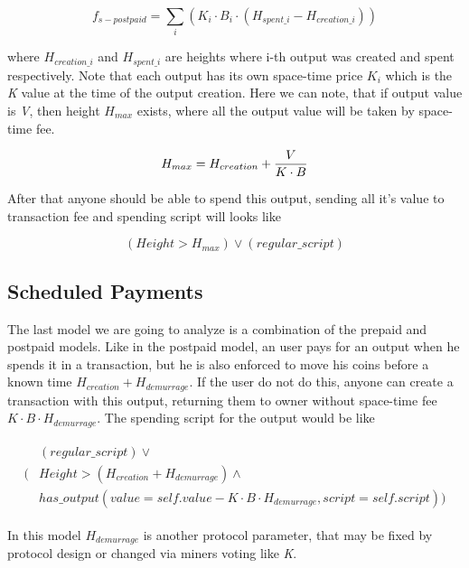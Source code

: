 \documentclass[]{article}   %
\begin{document}
\begin{equation}
f_{s-postpaid} = \sum_i{(K_i \cdot B_i \cdot (H_{spent\_i} - H_{creation\_i}))}
\end{equation}

where $H_{creation\_i}$ and $H_{spent\_i}$ are heights where i-th output was created and spent respectively. Note that each output has its own space-time price \textit{$K_i$} which is the \textit{K} value at the time of the output creation. Here we can note, that if output value is \textit{V}, then height \textit{$H_{max}$} exists, where all the output value will be taken by space-time fee.

\begin{equation}
H_{max} = {H_{creation} + {V \over {K \cdot B}}}
\end{equation}

After that anyone should be able to spend this output, sending all it's value to transaction fee and spending script will looks like

\begin{equation}
(Height > H_{max}) \lor (regular\_script)
\end{equation}

\subsection{Scheduled Payments}
\label{sec-scheduled}

The last model we are going to analyze is a combination of the prepaid and postpaid models. Like in the postpaid model, an user pays for an output when he spends it in a transaction, but he is also enforced to move his coins before a known time $H_{creation} + H_{demurrage}$. If the user do not do this, anyone can create a transaction with this output, returning them to owner without space-time fee ${K \cdot B \cdot H_{demurrage}}$. The spending script for the output would be like

\begin{align}
\begin{split}
&(regular\_script) \lor \\
(&Height > (H_{creation} + H_{demurrage}) \land \\  
&  has\_output(value = self.value - K \cdot B \cdot H_{demurrage}, script = self.script))
\end{split}
\end{align}



In this model $H_{demurrage}$ is another protocol parameter, that may be fixed by protocol design or changed via miners voting like \textit{K}.
\end{document}
